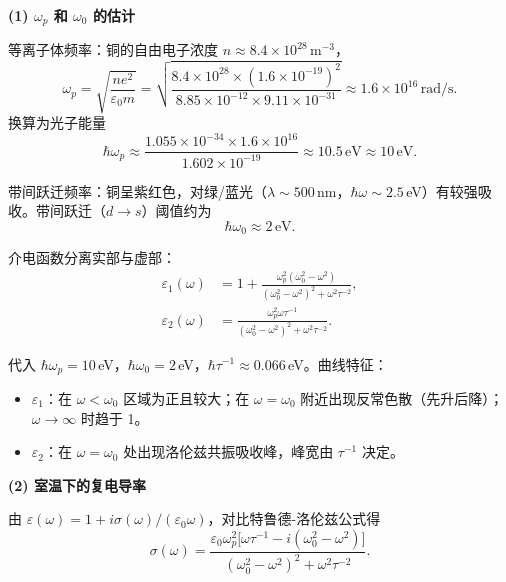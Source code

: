 \begin{derivationbox}[标准解题过程]
\textbf{(1) $\omega_p$ 和 $\omega_0$ 的估计}

等离子体频率：铜的自由电子浓度 $n\approx8.4\times10^{28}\,\text{m}^{-3}$，
\begin{equation}
\omega_p=\sqrt{\frac{ne^2}{\varepsilon_0 m}}
=\sqrt{\frac{8.4\times10^{28}\times(1.6\times10^{-19})^2}{8.85\times10^{-12}\times9.11\times10^{-31}}}
\approx1.6\times10^{16}\,\text{rad/s}.
\end{equation}
换算为光子能量
\begin{equation}
\hbar\omega_p\approx\frac{1.055\times10^{-34}\times1.6\times10^{16}}{1.602\times10^{-19}}
\approx\boxed{10.5\,\text{eV}\approx10\,\text{eV}.}
\end{equation}

带间跃迁频率：铜呈紫红色，对绿/蓝光（$\lambda\sim500\,$nm，$\hbar\omega\sim2.5\,$eV）有较强吸收。带间跃迁（$d\to s$）阈值约为
\begin{equation}
\boxed{\hbar\omega_0\approx2\,\text{eV}.}
\end{equation}

介电函数分离实部与虚部：
\begin{align}
\varepsilon_1(\omega)&=1+\frac{\omega_p^2(\omega_0^2-\omega^2)}{(\omega_0^2-\omega^2)^2+\omega^2\tau^{-2}},\\
\varepsilon_2(\omega)&=\frac{\omega_p^2\omega\tau^{-1}}{(\omega_0^2-\omega^2)^2+\omega^2\tau^{-2}}.
\end{align}

代入 $\hbar\omega_p=10\,$eV，$\hbar\omega_0=2\,$eV，$\hbar\tau^{-1}\approx0.066\,$eV。曲线特征：
\begin{itemize}
    \item $\varepsilon_1$：在 $\omega<\omega_0$ 区域为正且较大；在 $\omega=\omega_0$ 附近出现反常色散（先升后降）；$\omega\to\infty$ 时趋于 1。
    \item $\varepsilon_2$：在 $\omega=\omega_0$ 处出现洛伦兹共振吸收峰，峰宽由 $\tau^{-1}$ 决定。
\end{itemize}

\textbf{(2) 室温下的复电导率}

由 $\varepsilon(\omega)=1+i\sigma(\omega)/(\varepsilon_0\omega)$，对比特鲁德-洛伦兹公式得
\begin{equation}
\sigma(\omega)=\frac{\varepsilon_0\omega_p^2\bigl[\omega\tau^{-1}-i(\omega_0^2-\omega^2)\bigr]}{(\omega_0^2-\omega^2)^2+\omega^2\tau^{-2}}.
\end{equation}


\end{derivationbox}
